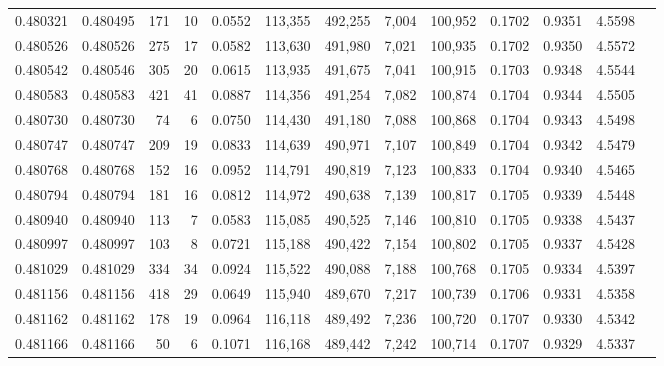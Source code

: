 \begin{tabular}{rrrrrrrrrrrrr}
0.480321 & 0.480495 &   171 &    10 &                                     0.0552 & 113,355 & 492,255 &   7,004 & 100,952 & 0.1702 & 0.9351 & 4.5598 \\
0.480526 & 0.480526 &   275 &    17 &                                     0.0582 & 113,630 & 491,980 &   7,021 & 100,935 & 0.1702 & 0.9350 & 4.5572 \\
0.480542 & 0.480546 &   305 &    20 &                                     0.0615 & 113,935 & 491,675 &   7,041 & 100,915 & 0.1703 & 0.9348 & 4.5544 \\
0.480583 & 0.480583 &   421 &    41 &                                     0.0887 & 114,356 & 491,254 &   7,082 & 100,874 & 0.1704 & 0.9344 & 4.5505 \\
0.480730 & 0.480730 &    74 &     6 &                                     0.0750 & 114,430 & 491,180 &   7,088 & 100,868 & 0.1704 & 0.9343 & 4.5498 \\
0.480747 & 0.480747 &   209 &    19 &                                     0.0833 & 114,639 & 490,971 &   7,107 & 100,849 & 0.1704 & 0.9342 & 4.5479 \\
0.480768 & 0.480768 &   152 &    16 &                                     0.0952 & 114,791 & 490,819 &   7,123 & 100,833 & 0.1704 & 0.9340 & 4.5465 \\
0.480794 & 0.480794 &   181 &    16 &                                     0.0812 & 114,972 & 490,638 &   7,139 & 100,817 & 0.1705 & 0.9339 & 4.5448 \\
0.480940 & 0.480940 &   113 &     7 &                                     0.0583 & 115,085 & 490,525 &   7,146 & 100,810 & 0.1705 & 0.9338 & 4.5437 \\
0.480997 & 0.480997 &   103 &     8 &                                     0.0721 & 115,188 & 490,422 &   7,154 & 100,802 & 0.1705 & 0.9337 & 4.5428 \\
0.481029 & 0.481029 &   334 &    34 &                                     0.0924 & 115,522 & 490,088 &   7,188 & 100,768 & 0.1705 & 0.9334 & 4.5397 \\
0.481156 & 0.481156 &   418 &    29 &                                     0.0649 & 115,940 & 489,670 &   7,217 & 100,739 & 0.1706 & 0.9331 & 4.5358 \\
0.481162 & 0.481162 &   178 &    19 &                                     0.0964 & 116,118 & 489,492 &   7,236 & 100,720 & 0.1707 & 0.9330 & 4.5342 \\
0.481166 & 0.481166 &    50 &     6 &                                     0.1071 & 116,168 & 489,442 &   7,242 & 100,714 & 0.1707 & 0.9329 & 4.5337 \\

\end{tabular}
